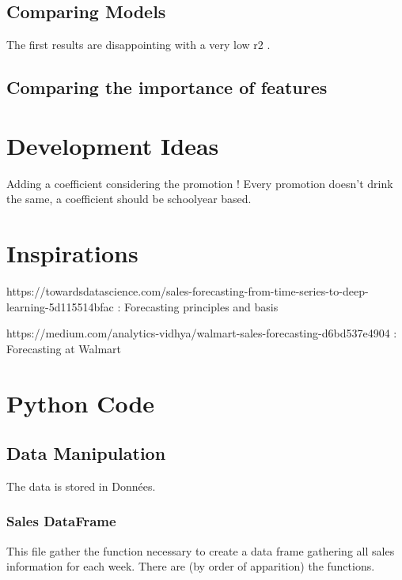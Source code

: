 \documentclass{report}
\begin{document}
\section{Comparing Models}

The first results are disappointing with a very low r2 .







\section{Comparing the importance of features}


\chapter{Development Ideas}

Adding a coefficient considering the promotion ! Every promotion doesn't drink the same, a coefficient should be schoolyear based.






\chapter{Inspirations}

https://towardsdatascience.com/sales-forecasting-from-time-series-to-deep-learning-5d115514bfac : Forecasting principles and basis

https://medium.com/analytics-vidhya/walmart-sales-forecasting-d6bd537e4904 : Forecasting at Walmart






\chapter{Python Code}

\section{Data Manipulation}
The data is stored in Données.\\

\subsection{Sales DataFrame}

This file gather the function necessary to create a data frame gathering all sales information for each week. There are (by order of apparition) the functions.
\end{document}
